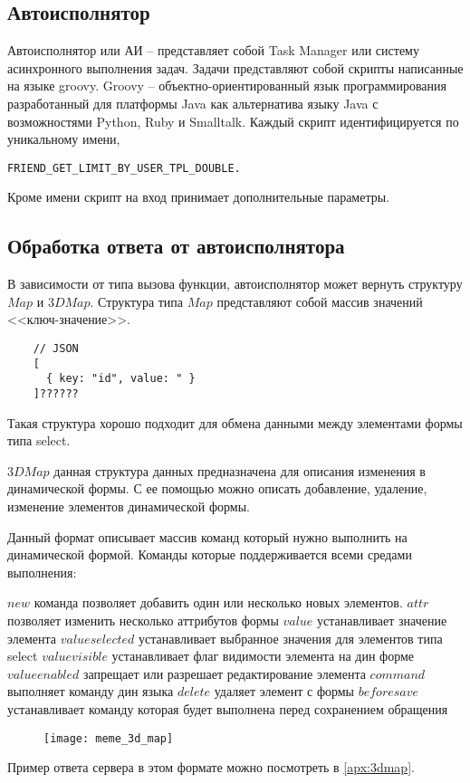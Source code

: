 \documentclass[../index.tex]{subfiles}
\begin{document}
\subsection{Автоисполнятор}\label{autoexec}

Автоисполнятор или АИ -- представляет собой Task Manager или систему асинхронного выполнения задач. 
Задачи представляют собой скрипты написанные на языке groovy. 
Groovy -- объектно-ориентированный язык программирования разработанный для платформы 
Java как альтернатива языку Java с возможностями Python, Ruby и Smalltalk. 
Каждый скрипт идентифицируется по уникальному имени,
\begin{verbatim}
FRIEND_GET_LIMIT_BY_USER_TPL_DOUBLE. 
\end{verbatim}

Кроме имени скрипт на вход принимает дополнительные параметры. 

\subsection{Обработка ответа от автоисполнятора}

В зависимости от типа вызова функции, автоисполнятор может вернуть структуру $Map$ и $3DMap$.
Структура типа $Map$ представляют собой массив значений <<ключ-значение>>.

\begin{verbatim}
    // JSON 
    [
      { key: "id", value: " }
    ]??????
\end{verbatim}

Такая структура хорошо подходит для обмена данными между элементами формы типа select.

$3DMap$ данная структура данных предназначена для описания изменения в динамической формы.
С ее помощью можно описать добавление, удаление, изменение элементов динамической формы.

Данный формат описывает массив команд который нужно выполнить на динамической формой.
Команды которые поддерживается всеми средами выполнения:

$new$ команда позволяет добавить один или несколько новых элементов.
$attr$ позволяет изменить несколько аттрибутов формы
$value$ устанавливает значение элемента
$valueselected$ устанавливает выбранное значения для элементов типа select
$valuevisible$ устанавливает флаг видимости элемента на дин форме
$valueenabled$ запрещает или разрешает редактирование элемента
$command$ выполняет команду дин языка
$delete$ удаляет элемент с формы
$beforesave$ устанавливает команду которая будет выполнена перед сохранением обращения

\begin{figure}[h]
	\texttt{[image: meme\_3d\_map]}
	\centering
\end{figure}


Пример ответа сервера в этом формате можно посмотреть в \autoref{apx:3dmap}.
\end{document}
